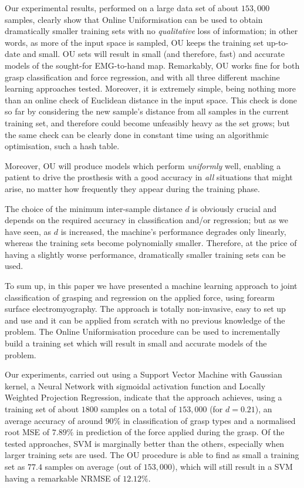 Our experimental results, performed on a large data set of about
$153,000$ samples, clearly show that Online Uniformisation can be used
to obtain dramatically smaller training sets with no
\emph{qualitative} loss of information; in other words, as more of the
input space is sampled, OU keeps the training set up-to-date and
small. OU sets will result in small (and therefore, fast) and accurate
models of the sought-for EMG-to-hand map. Remarkably, OU works fine
for both grasp classification and force regression, and with all three
different machine learning approaches tested. Moreover, it is
extremely simple, being nothing more than an online check of Euclidean
distance in the input space. This check is done so far by considering
the new sample's distance from all samples in the current training
set, and therefore could become unfeasibly heavy as the set grows; but
the same check can be clearly done in constant time using an
algorithmic optimisation, such a hash table.

Moreover, OU will produce models which perform \emph{uniformly} well,
enabling a patient to drive the prosthesis with a good accuracy in
\emph{all} situations that might arise, no matter how frequently they
appear during the training phase.

The choice of the minimum inter-sample distance $d$ is obviously
crucial and depends on the required accuracy in classification and/or
regression; but as we have seen, as $d$ is increased, the machine's
performance degrades only linearly, whereas the training sets become
polynomially smaller. Therefore, at the price of having a slightly
worse performance, dramatically smaller training sets can be used.

To sum up, in this paper we have presented a machine learning
approach to joint classification of grasping and regression on the
applied force, using forearm surface electromyography. The approach is
totally non-invasive, easy to set up and use and it can be applied
from scratch with no previous knowledge of the problem. The Online
Uniformisation procedure can be used to incrementally build a training
set which will result in small and accurate models of the problem.

Our experiments, carried out using a Support Vector Machine with
Gaussian kernel, a Neural Network with sigmoidal activation function
and Locally Weighted Projection Regression, indicate that the approach
achieves, using a training set of about $1800$ samples on a total of
$153,000$ (for $d=0.21$), an average accuracy of around $90\%$ in
classification of grasp types and a normalised root MSE of $7.89\%$ in
prediction of the force applied during the grasp. Of the tested
approaches, SVM is marginally better than the others, especially when
larger training sets are used. The OU procedure is able to find as
small a training set as $77.4$ samples on average (out of $153,000$),
which will still result in a SVM having a remarkable NRMSE of
$12.12\%$.

